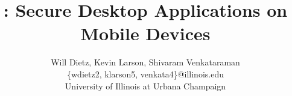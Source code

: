 \documentclass[letterpaper,twocolumn,10pt]{article}
\title{\proj : Secure Desktop Applications on Mobile Devices}
\author{Will Dietz, Kevin Larson, Shivaram Venkataraman\\
\{wdietz2, klarson5, venkata4\}@illinois.edu\\
University of Illinois at Urbana Champaign}
\date{}
\begin{document}
\maketitle



\label{sec:intro}











\end{document}
